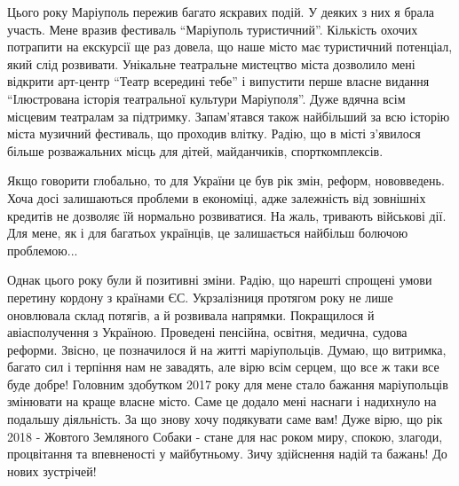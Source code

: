 Цього року Маріуполь пережив багато яскравих подій. У деяких з них я брала
участь. Мене вразив фестиваль \enquote{Маріуполь туристичний}. Кількість охочих
потрапити на екскурсії ще раз довела, що наше місто має туристичний потенціал,
який слід розвивати. Унікальне театральне мистецтво міста дозволило мені
відкрити арт-центр \enquote{Театр всередині тебе} і випустити перше власне видання
\enquote{Ілюстрована історія театральної культури Маріуполя}. Дуже вдячна всім місцевим
театралам за підтримку. Запам'ятався також найбільший за всю історію міста
музичний фестиваль, що проходив влітку. Радію, що в місті з'явилося більше
розважальних місць для дітей, майданчиків, спорткомплексів.

Якщо говорити глобально, то для України це був рік змін, реформ, нововведень.
Хоча досі залишаються проблеми в економіці, адже залежність від зовнішніх
кредитів не дозволяє їй нормально розвиватися. На жаль, тривають військові дії.
Для мене, як і для багатьох українців, це залишається найбільш болючою
проблемою...

Однак цього року були й позитивні зміни. Радію, що нарешті спрощені умови
перетину кордону з країнами ЄС. Укрзалізниця протягом року не лише оновлювала
склад потягів, а й розвивала напрямки. Покращилося й авіасполучення з Україною.
Проведені пенсійна, освітня, медична, судова реформи. Звісно, це позначилося й
на житті маріупольців. Думаю, що витримка, багато сил і терпіння нам не
завадять, але вірю всім серцем, що все ж таки все буде добре! Головним
здобутком 2017 року для мене стало бажання маріупольців змінювати на краще
власне місто. Саме це додало мені наснаги і надихнуло на подальшу діяльність.
За що знову хочу подякувати саме вам! Дуже вірю, що рік 2018 -  Жовтого
Земляного Собаки - стане для нас роком миру, спокою, злагоди, процвітання та
впевненості у майбутньому. Зичу здійснення надій та бажань! До нових зустрічей!

\clearpage

